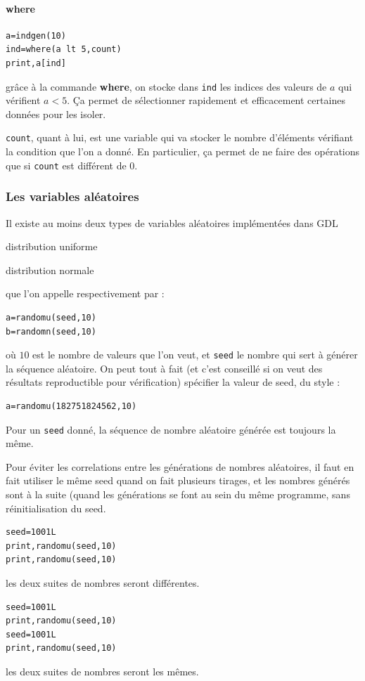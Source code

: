 \documentclass[a4paper,twoside]{article}
\begin{document}
\paragraph{where}
\begin{verbatim}
a=indgen(10)
ind=where(a lt 5,count)
print,a[ind]
\end{verbatim}
grâce à la commande \textbf{where}, on stocke dans \texttt{ind} les indices des valeurs de $a$ qui vérifient $a < 5$. Ça permet de sélectionner rapidement et efficacement certaines données pour les isoler.

\texttt{count}, quant à lui, est une variable qui va stocker le nombre d'éléments vérifiant la condition que l'on a donné. En particulier, ça permet de ne faire des opérations que si \texttt{count} est différent de 0.

\subsubsection{Les variables aléatoires}
Il existe au moins deux types de variables aléatoires implémentées dans GDL
\begin{enuminline}
\item distribution uniforme
\item distribution normale
\end{enuminline}
que l'on appelle respectivement par :
\begin{verbatim}
a=randomu(seed,10)
b=randomn(seed,10)
\end{verbatim}
où $10$ est le nombre de valeurs que l'on veut, et \texttt{seed} le nombre qui sert à générer la séquence aléatoire. On peut tout à fait (et c'est conseillé si on veut des résultats reproductible pour vérification) spécifier la valeur de seed, du style :
\begin{verbatim}
a=randomu(182751824562,10)
\end{verbatim}

\begin{remarque}
Pour un \texttt{seed} donné, la séquence de nombre aléatoire générée est toujours la même.
\end{remarque}

Pour éviter les correlations entre les générations de nombres aléatoires, il faut en fait utiliser le même seed quand on fait plusieurs tirages, et les nombres générés sont à la suite (quand les générations se font au sein du même programme, sans réinitialisation du seed.

\begin{exemple}
\begin{verbatim}
seed=1001L
print,randomu(seed,10)
print,randomu(seed,10)
\end{verbatim}
les deux suites de nombres seront différentes.

\bigskip

\begin{verbatim}
seed=1001L
print,randomu(seed,10)
seed=1001L
print,randomu(seed,10)
\end{verbatim}
les deux suites de nombres seront les mêmes.
\end{exemple}
\end{document}

